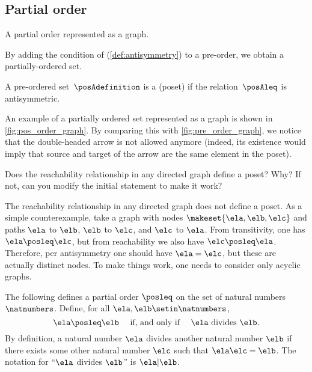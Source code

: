 \vfill

\subsection{Partial order}

\begin{marginfigure}
    \centering
    \caption{A partial order represented as a graph.}
    \label{fig:pos_order_graph}
\end{marginfigure}
By adding the condition of \emph{} (\cref{def:antisymmetry}) to a pre-order, we obtain a partially-ordered set.

\begin{ctdefinition}
    \label{def:poset}
    A pre-ordered set~$\posAdefinition$ is a  (poset) if the relation~$\posAleq$ is antisymmetric.
\end{ctdefinition}

An example of a partially ordered set represented as a graph is shown in \cref{fig:pos_order_graph}.
By comparing this with \cref{fig:pre_order_graph}, we notice that the double-headed arrow is not allowed anymore (indeed, its existence would imply that source and target of the arrow are the same element in the poset).

\begin{exercise}
    \label{ex:reachabilityposet}
    Does the reachability relationship in any directed graph define a poset?
    Why?
    If not, can you modify the initial statement to make it work?
\end{exercise}
\begin{solution}
    The reachability relationship in any directed graph does not define a poset.
    As a simple counterexample, take a graph with nodes $\makeset{\ela,\elb,\elc}$ and paths $\ela$ to $\elb$, $\elb$ to $\elc$, and $\elc$ to $\ela$.
    From transitivity, one has $\ela \posleq \elc$, but from reachability we also have $\elc\posleq \ela$.
    Therefore, per antisymmetry one should have $\ela=\elc$, but these are actually distinct nodes.
    To make things work, one needs to consider only acyclic graphs.
\end{solution}


\begin{example}
    The following defines a partial order $\posleq$ on the set of natural numbers $\natnumbers$.
    Define, for all $\ela, \elb \setin \natnumbers$,
    \begin{equation}
        \ela \posleq \elb \quad \text{ if, and only if } \quad \ela \text{ divides } \elb.
    \end{equation}
    By definition, a natural number $\ela$ divides another natural number $\elb$ if there exists some other natural number $\elc$ such that $\ela \elc = \elb$.
    The notation for ``$\ela$ divides $\elb$'' is $\ela \vert \elb$.

\end{example}


